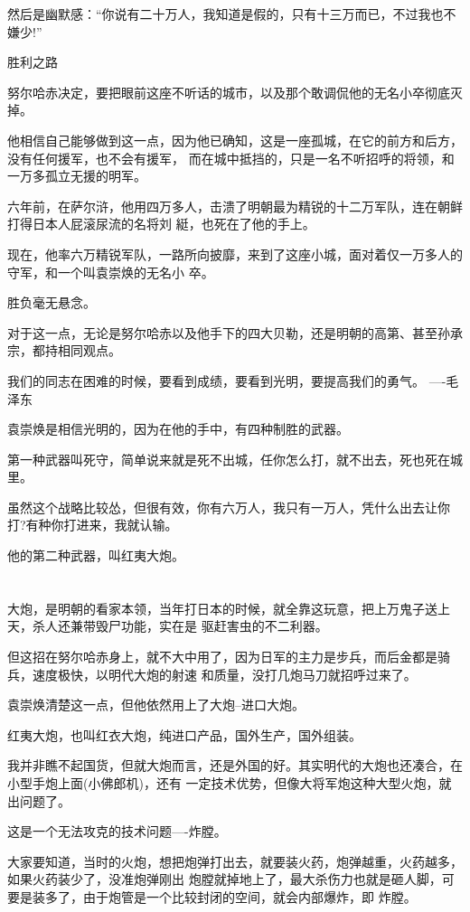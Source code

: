 \documentclass[11pt,a4paper,onecolumn]{article}
\begin{document}
然后是幽默感：``你说有二十万人，我知道是假的，只有十三万而已，不过我也不嫌少!''

胜利之路

努尔哈赤决定，要把眼前这座不听话的城市，以及那个敢调侃他的无名小卒彻底灭掉。

他相信自己能够做到这一点，因为他已确知，这是一座孤城，在它的前方和后方，没有任何援军，也不会有援军，
而在城中抵挡的，只是一名不听招呼的将领，和一万多孤立无援的明军。

六年前，在萨尔浒，他用四万多人，击溃了明朝最为精锐的十二万军队，连在朝鲜打得日本人屁滚尿流的名将刘
綎，也死在了他的手上。

现在，他率六万精锐军队，一路所向披靡，来到了这座小城，面对着仅一万多人的守军，和一个叫袁崇焕的无名小
卒。

胜负毫无悬念。

对于这一点，无论是努尔哈赤以及他手下的四大贝勒，还是明朝的高第、甚至孙承宗，都持相同观点。

我们的同志在困难的时候，要看到成绩，要看到光明，要提高我们的勇气。 ----毛泽东

袁崇焕是相信光明的，因为在他的手中，有四种制胜的武器。

第一种武器叫死守，简单说来就是死不出城，任你怎么打，就不出去，死也死在城里。

虽然这个战略比较怂，但很有效，你有六万人，我只有一万人，凭什么出去让你打?有种你打进来，我就认输。

他的第二种武器，叫红夷大炮。

\section[\thesection]{}

大炮，是明朝的看家本领，当年打日本的时候，就全靠这玩意，把上万鬼子送上天，杀人还兼带毁尸功能，实在是
驱赶害虫的不二利器。

但这招在努尔哈赤身上，就不大中用了，因为日军的主力是步兵，而后金都是骑兵，速度极快，以明代大炮的射速
和质量，没打几炮马刀就招呼过来了。

袁崇焕清楚这一点，但他依然用上了大炮--进口大炮。

红夷大炮，也叫红衣大炮，纯进口产品，国外生产，国外组装。

我并非瞧不起国货，但就大炮而言，还是外国的好。其实明代的大炮也还凑合，在小型手炮上面(小佛郎机)，还有
一定技术优势，但像大将军炮这种大型火炮，就出问题了。

这是一个无法攻克的技术问题----炸膛。

大家要知道，当时的火炮，想把炮弹打出去，就要装火药，炮弹越重，火药越多，如果火药装少了，没准炮弹刚出
炮膛就掉地上了，最大杀伤力也就是砸人脚，可要是装多了，由于炮管是一个比较封闭的空间，就会内部爆炸，即
炸膛。
\end{document}
